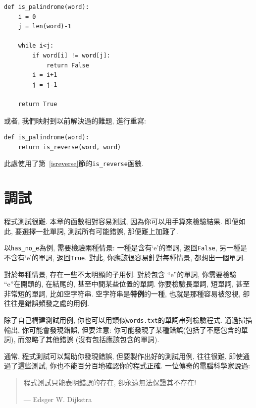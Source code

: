 \documentclass[10pt]{book}
\begin{document}
\begin{verbatim}
def is_palindrome(word):
    i = 0
    j = len(word)-1

    while i<j:
        if word[i] != word[j]:
            return False
        i = i+1
        j = j-1

    return True
\end{verbatim}

或者, 我們映射到以前解決過的難題, 進行重寫:

\begin{verbatim}
def is_palindrome(word):
    return is_reverse(word, word)
\end{verbatim}
%
此處使用了第~\ref{isreverse}節的\verb"is_reverse"函數.


\section{調試}

程式測試很難. 本章的函數相對容易測試, 因為你可以用手算來檢驗結果. 
即便如此, 要選擇一批單詞, 測試所有可能錯誤, 那便難上加難了. 

以\verb"has_no_e"為例, 需要檢驗兩種情景: 一種是含有`e'的單詞, 返回{\tt False}, 
另一種是不含有`e'的單詞, 返回{\tt True}. 
對此, 你應該很容易針對每種情景, 都想出一個單詞. 

對於每種情景, 存在一些不太明顯的子用例. 
對於包含 ``e''的單詞, 你需要檢驗 ``e''在開頭的, 在結尾的, 甚至中間某些位置的單詞. 
你要檢驗長單詞, 短單詞, 甚至非常短的單詞, 比如空字符串. 
空字符串是{\bf 特例}的一種, 也就是那種容易被忽視, 卻往往是錯誤頻發之處的用例. 

除了自己構建測試用例, 你也可以用類似{\tt words.txt}的單詞串列檢驗程式. 
通過掃描輸出, 你可能會發現錯誤, 但要注意: 
你可能發現了某種錯誤(包括了不應包含的單詞), 而忽略了其他錯誤
(沒有包括應該包含的單詞). 

通常, 程式測試可以幫助你發現錯誤, 但要製作出好的測試用例, 
往往很難, 即使通過了這些測試, 你也不能百分百地確認你的程式正確. 
一位傳奇的電腦科學家說過:

\begin{quote}

程式測試只能表明錯誤的存在, 卻永遠無法保證其不存在!

--- Edsger W. Dijkstra
\end{quote}
\end{document}
